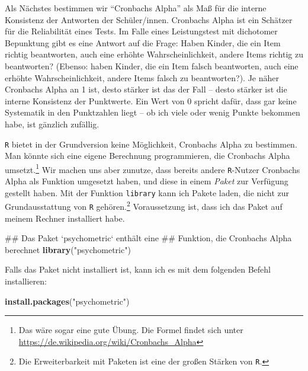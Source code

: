 \documentclass[12pt,]{tufte-book}
\newenvironment{Shaded}{\begin{snugshade}}{\end{snugshade}}
\newcommand{\KeywordTok}[1]{\textcolor[rgb]{0.13,0.29,0.53}{\textbf{#1}}}
\newcommand{\StringTok}[1]{\textcolor[rgb]{0.31,0.60,0.02}{#1}}
\newcommand{\NormalTok}[1]{#1}
\theoremstyle{definition}
\theoremstyle{definition}
\theoremstyle{definition}
\theoremstyle{remark}
\begin{document}
Als Nächstes bestimmen wir ``Cronbachs Alpha'' als Maß für die interne
Konsistenz der Antworten der Schüler/innen. Cronbachs Alpha ist ein
Schätzer für die Reliabilität eines Tests. Im Falle eines Leistungstest
mit dichotomer Bepunktung gibt es eine Antwort auf die Frage: Haben
Kinder, die ein Item richtig beantworten, auch eine erhöhte
Wahrscheinlichkeit, andere Items richtig zu beantworten? (Ebenso: haben
Kinder, die ein Item falsch beantworten, auch eine erhöhte
Wahrscheinlichkeit, andere Items falsch zu beantworten?). Je näher
Cronbachs Alpha an 1 ist, desto stärker ist das der Fall -- desto
stärker ist die interne Konsistenz der Punktwerte. Ein Wert von 0
spricht dafür, dass gar keine Systematik in den Punktzahlen liegt -- ob
ich viele oder wenig Punkte bekommen habe, ist gänzlich zufällig.

\texttt{R} bietet in der Grundversion keine Möglichkeit, Cronbachs Alpha
zu bestimmen. Man könnte sich eine eigene Berechnung programmieren, die
Cronbachs Alpha umsetzt.\footnote{Das wäre sogar eine gute Übung. Die
  Formel findet sich unter
  \url{https://de.wikipedia.org/wiki/Cronbachs_Alpha}} Wir machen uns
aber zunutze, dass bereits andere \texttt{R}-Nutzer Cronbachs Alpha als
Funktion umgesetzt haben, und diese in einem \emph{Paket} zur Verfügung
gestellt haben. Mit der Funktion \texttt{library} kann ich Pakete laden,
die nicht zur Grundausstattung von \texttt{R} gehören.\footnote{Die
  Erweiterbarkeit mit Paketen ist eine der großen Stärken von
  \texttt{R}.} Voraussetzung ist, dass ich das Paket auf meinem Rechner
installiert habe.

\begin{Shaded}
\begin{Highlighting}[]
\NormalTok{## Das Paket `psychometric` enthält eine}
\NormalTok{## Funktion, die Cronbachs Alpha berechnet}
\KeywordTok{library}\NormalTok{(}\StringTok{"psychometric"}\NormalTok{)}
\end{Highlighting}
\end{Shaded}

Falls das Paket nicht installiert ist, kann ich es mit dem folgenden
Befehl installieren:

\begin{Shaded}
\begin{Highlighting}[]
\KeywordTok{install.packages}\NormalTok{(}\StringTok{"psychometric"}\NormalTok{)}
\end{Highlighting}
\end{Shaded}
\end{document}
